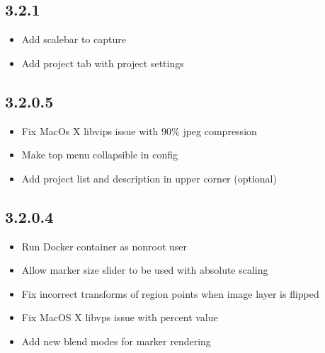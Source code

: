 \documentclass[letterpaper,10pt,english,openany,oneside]{sphinxmanual}
\begin{document}
\subsection{3.2.1}
\label{\detokenize{docs/intro/versions:id6}}\begin{itemize}
\item {} 
\sphinxAtStartPar
Add scalebar to capture

\item {} 
\sphinxAtStartPar
Add project tab with project settings

\end{itemize}


\subsection{3.2.0.5}
\label{\detokenize{docs/intro/versions:id7}}\begin{itemize}
\item {} 
\sphinxAtStartPar
Fix MacOs X libvips issue with 90\% jpeg compression

\item {} 
\sphinxAtStartPar
Make top menu collapsible in config

\item {} 
\sphinxAtStartPar
Add project list and description in upper corner (optional)

\end{itemize}


\subsection{3.2.0.4}
\label{\detokenize{docs/intro/versions:id8}}\begin{itemize}
\item {} 
\sphinxAtStartPar
Run Docker container as non\sphinxhyphen{}root user

\item {} 
\sphinxAtStartPar
Allow marker size slider to be used with absolute scaling

\item {} 
\sphinxAtStartPar
Fix incorrect transforms of region points when image layer is flipped

\item {} 
\sphinxAtStartPar
Fix MacOS X libvps issue with percent value

\item {} 
\sphinxAtStartPar
Add new blend modes for marker rendering

\end{itemize}
\end{document}
